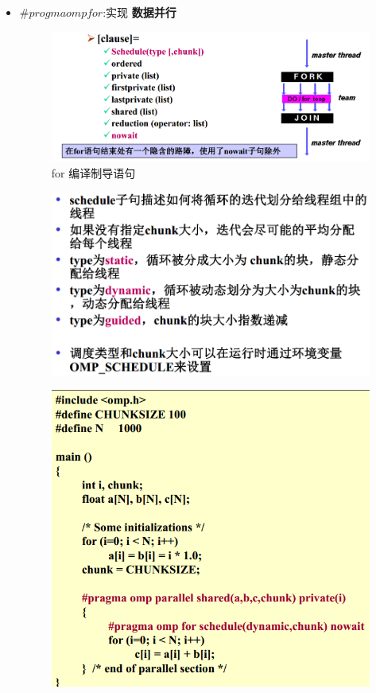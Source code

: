 \documentclass[UTF8,a4paper]{ctexart}
\begin{document}
\begin{itemize}
  \item $\# progma omp for$:实现 \textbf{数据并行}
  \begin{figure}[H]
    \centering
    \includegraphics[scale = 0.3]{assets/ParallelComputing_b7a11.png}
    \caption{for 编译制导语句}
  \end{figure}
  \begin{figure}[H]
    \centering
    \includegraphics[scale = 0.3]{assets/ParallelComputing_4f6ae.png}
  \end{figure}
  \begin{figure}[H]
    \centering
    \includegraphics[scale = 0.3]{assets/ParallelComputing_67663.png}

\end{figure}
\end{itemize}
\end{document}
